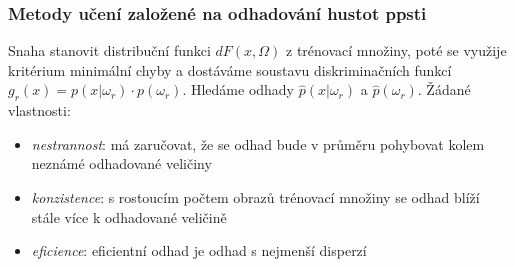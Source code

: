 \subsubsection*{Metody učení založené na odhadování hustot ppsti}
Snaha stanovit distribuční funkci $ dF(x, \Omega) $ z trénovací množiny, poté se využije kritérium minimální chyby a dostáváme soustavu diskriminačních funkcí $ g_r(x) = p(x|\omega_r) \cdot p(\omega_r) $. Hledáme odhady $ \hat{p}(x|\omega_r) $ a $ \hat{p}(\omega_r) $. Žádané vlastnosti:
\begin{itemize}
\item \textit{nestrannost}: má zaručovat, že se odhad bude v průměru pohybovat kolem neznámé odhadované veličiny
\item \textit{konzistence}: s rostoucím počtem obrazů trénovací množiny se odhad blíží stále více k odhadované veličině
\item \textit{eficience}: eficientní odhad je odhad s nejmenší disperzí
\end{itemize}

